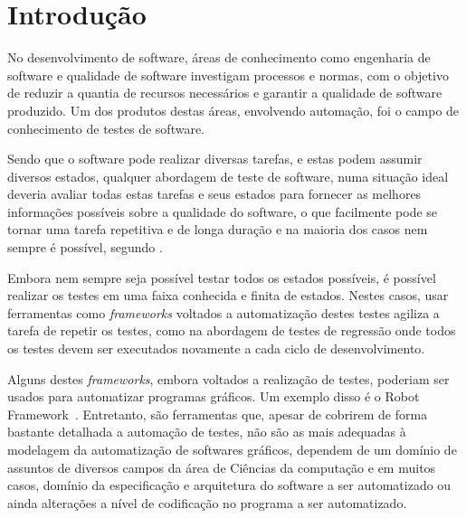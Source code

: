 \documentclass[12pt]{article}
\begin{document}
	\section{Introdução}

    	No desenvolvimento de software, áreas de conhecimento como engenharia de software e qualidade de software investigam processos e normas, com o objetivo de reduzir a quantia de recursos necessários e garantir a qualidade de software produzido. Um dos produtos destas áreas, envolvendo automação, foi o campo de conhecimento de testes de software.

        Sendo que o software pode realizar diversas tarefas, e estas podem assumir diversos estados, qualquer abordagem de teste de software, numa situação ideal deveria avaliar todas estas tarefas e seus estados para fornecer as melhores informações possíveis sobre a qualidade do software, o que facilmente pode se tornar uma tarefa repetitiva e de longa duração e na maioria dos casos nem sempre é possível, segundo \cite[pag. 10]{myers2011art}.

        Embora nem sempre seja possível testar todos os estados possíveis, é possível realizar os testes em uma faixa conhecida e finita de estados. Nestes casos, usar ferramentas como \emph{frameworks} voltados a automatização destes testes agiliza a tarefa de repetir os testes, como na abordagem de testes de regressão onde todos os testes devem ser executados novamente a cada ciclo de desenvolvimento.


        Alguns destes \emph{frameworks}, embora voltados a realização de testes, poderiam ser usados para automatizar programas gráficos. Um exemplo disso é o Robot Framework~\cite{robotFW}. Entretanto, são ferramentas que, apesar de cobrirem de forma bastante detalhada a automação de testes, não são as mais adequadas à modelagem da automatização de softwares gráficos, dependem de um domínio de assuntos de diversos campos da área de Ciências da computação e em muitos casos, domínio da especificação e arquitetura do software a ser automatizado ou ainda alterações a nível de codificação no programa a ser automatizado.
\end{document}
